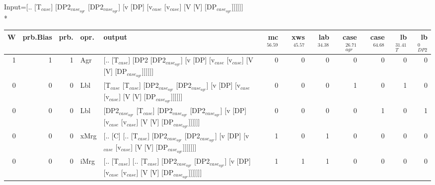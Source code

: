 \begingroup\scriptsize Input=[.. [T$_{case}$] [DP2$_{case_{agr}}$ [DP2$_{case_{agr}}$] [v [DP] [v$_{case}$ [v$_{case}$] [V [V] [DP$_{case_{agr}}$]]]]]]\\*
\begin{tabularx}{\linewidth}{rrrlXrrrrrrr}
\hline
   W &   prb.Bias &   prb. & opr.   & output                                                                                                                                                                           &   mc$^{56.59}$ &   xws$^{45.57}$ &   lab$^{34.38}$ &   case$_{agr}^{26.71}$ &   case$^{64.68}$ &   lb$_{T}^{31.41}$ &   lb$_{DP2}^{0}$ \\
\hline
   1 &       1 &   1 & Agr  & [.. [T$_{case}$] [DP2 [DP2$_{case_{agr}}$] [v [DP] [v$_{case}$ [v$_{case}$] [V [V] [DP$_{case_{agr}}$]]]]]]                                                                                              &            0 &             0 &             0 &                  0 &              0 &              0 &            0 \\
   0 &       0 &   0 & Lbl  & [T$_{case}$ [T$_{case}$] [DP2$_{case_{agr}}$ [DP2$_{case_{agr}}$] [v [DP] [v$_{case}$ [v$_{case}$] [V [V] [DP$_{case_{agr}}$]]]]]]                                                                                 &            0 &             0 &             0 &                  1 &              0 &              1 &            0 \\
   0 &       0 &   0 & Lbl  & [DP2$_{case_{agr}}$ [T$_{case}$] [DP2$_{case_{agr}}$ [DP2$_{case_{agr}}$] [v [DP] [v$_{case}$ [v$_{case}$] [V [V] [DP$_{case_{agr}}$]]]]]]                                                                           &            0 &             0 &             0 &                  0 &              1 &              0 &            1 \\
   0 &       0 &   0 & xMrg & [.. [C] [.. [T$_{case}$] [DP2$_{case_{agr}}$ [DP2$_{case_{agr}}$] [v [DP] [v$_{case}$ [v$_{case}$] [V [V] [DP$_{case_{agr}}$]]]]]]]                                                                            &            1 &             0 &             1 &                  0 &              0 &              0 &            0 \\
   0 &       0 &   0 & iMrg & [.. [T$_{case}$] [.. [T$_{case}$] [DP2$_{case_{agr}}$ [DP2$_{case_{agr}}$] [v [DP] [v$_{case}$ [v$_{case}$] [V [V] [DP$_{case_{agr}}$]]]]]]]                                                                       &            1 &             1 &             1 &                  0 &              0 &              0 &            0 \\

\end{tabularx}
